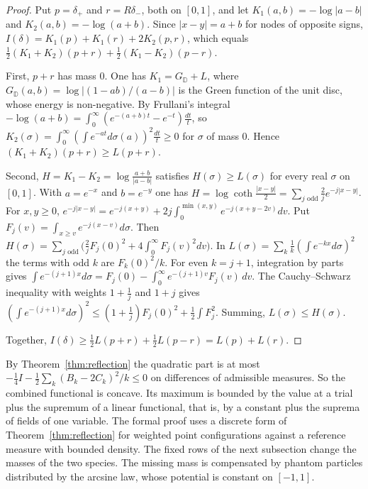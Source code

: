\begin{proof}
Put $p=\delta_+$ and $r=R\delta_-$, both on $[0,1]$, and let $K_1(a,b)=-\log|a-b|$ and $K_2(a,b)=-\log(a+b)$.
Since $|x-y|=a+b$ for nodes of opposite signs, $I(\delta)=K_1(p)+K_1(r)+2K_2(p,r)$, which equals
$\frac12(K_1+K_2)(p+r)+\frac12(K_1-K_2)(p-r)$.

First, $p+r$ has mass $0$. One has $K_1=G_{\mathbb D}+L$, where $G_{\mathbb D}(a,b)=\log|(1-ab)/(a-b)|$ is the
Green function of the unit disc, whose energy is non-negative. By Frullani's integral
$-\log(a+b)=\int_0^\infty(e^{-(a+b)t}-e^{-t})\frac{dt}t$, so $K_2(\sigma)=\int_0^\infty(\int e^{-at}d\sigma(a))^2
\frac{dt}t\ge0$ for $\sigma$ of mass $0$. Hence $(K_1+K_2)(p+r)\ge L(p+r)$.

Second, $H=K_1-K_2=\log\frac{a+b}{|a-b|}$ satisfies $H(\sigma)\ge L(\sigma)$ for every real $\sigma$ on $[0,1]$.
With $a=e^{-x}$ and $b=e^{-y}$ one has $H=\log\coth\frac{|x-y|}2=\sum_{j\text{ odd}}\frac2je^{-j|x-y|}$. For
$x,y\ge0$, $e^{-j|x-y|}=e^{-j(x+y)}+2j\int_0^{\min(x,y)}e^{-j(x+y-2v)}dv$. Put $F_j(v)=\int_{x\ge v}e^{-j(x-v)}
d\sigma$. Then $H(\sigma)=\sum_{j\text{ odd}}\bigl(\frac2jF_j(0)^2+4\int_0^\infty F_j(v)^2dv\bigr)$. In
$L(\sigma)=\sum_k\frac1k(\int e^{-kx}d\sigma)^2$ the terms with odd $k$ are $F_k(0)^2/k$. For even $k=j+1$,
integration by parts gives $\int e^{-(j+1)x}d\sigma=F_j(0)-\int_0^\infty e^{-(j+1)v}F_j(v)\,dv$. The
Cauchy--Schwarz inequality with weights $1+\frac1j$ and $1+j$ gives $(\int e^{-(j+1)x}d\sigma)^2\le
(1+\frac1j)F_j(0)^2+\frac12\int F_j^2$. Summing, $L(\sigma)\le H(\sigma)$.

Together, $I(\delta)\ge\frac12L(p+r)+\frac12L(p-r)=L(p)+L(r)$.
\end{proof}

By Theorem~\ref{thm:reflection} the quadratic part is at most
$-\frac14I-\frac12\sum_k(B_k-2C_k)^2/k\le0$ on differences of admissible measures. So the combined functional
is concave. Its maximum is bounded by the value at a trial plus the supremum of a linear functional, that
is, by a constant plus the suprema of fields of one variable. The formal proof uses a discrete form of
Theorem~\ref{thm:reflection} for weighted point configurations against a reference measure with bounded
density. The fixed rows of the next subsection change the masses of the two species. The missing mass is
compensated by phantom particles distributed by the arcsine law, whose potential is constant on $[-1,1]$.

